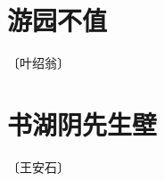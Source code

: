 \documentclass[12pt,UTF-8,openany]{ctexbook}
\begin{document}
\vspace{8pt}


\section{游园不值}

\begin{center}
    \vspace{10pt}
    
    \begin{normalsize}
        
        〔叶绍翁〕
        
    \end{normalsize}
    
    \vspace{8pt}
    
    \begin{large}
        
        
        
    \end{large}
    
\end{center}

\vspace{8pt}


\section{书湖阴先生壁}

\begin{center}
    \vspace{10pt}
    
    \begin{normalsize}
        
        〔王安石〕
        
    \end{normalsize}
    
    \vspace{8pt}
    
    \begin{large}
        
        
        
    \end{large}
    
\end{center}
\end{document}
